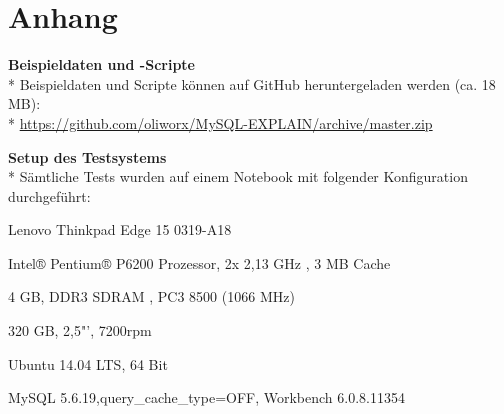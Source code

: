 \newpage
\section{Anhang}
\appendix
\textbf{Beispieldaten und -Scripte}\\*
Beispieldaten und Scripte können auf GitHub heruntergeladen werden (ca. 18 MB):\\*
\url{https://github.com/oliworx/MySQL-EXPLAIN/archive/master.zip}

\textbf{Setup des Testsystems}\\*
Sämtliche Tests wurden auf einem Notebook mit folgender Konfiguration durchgeführt:
\begin{description}[labelwidth=60pt]
  \item[Model] Lenovo Thinkpad Edge 15 0319-A18
  \item[CPU] Intel® Pentium® P6200 Prozessor, 2x 2,13 GHz , 3 MB Cache
  \item[RAM] 4 GB, DDR3 SDRAM , PC3 8500 (1066 MHz)
  \item[HDD] 320 GB, 2,5"', 7200rpm
  \item[OS] Ubuntu 14.04 LTS, 64 Bit
  \item[DB] MySQL 5.6.19,query\_cache\_type=OFF, Workbench 6.0.8.11354
\end{description}
